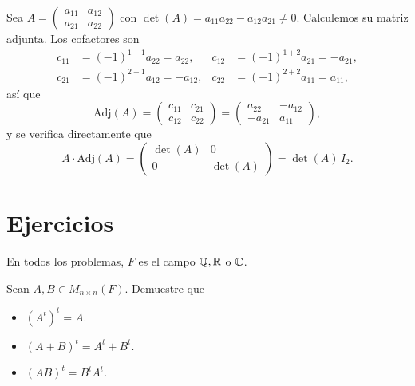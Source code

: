 \documentclass[12pt,a4paper]{book}
\newcommand{\parentesis}[1]{\left(#1\right)}
\begin{document}
    \begin{ejemplo}
        Sea $A = \begin{pmatrix} a_{11} & a_{12} \\ a_{21} & a_{22} \end{pmatrix}$ con $\det(A) = a_{11}a_{22} - a_{12}a_{21} \neq 0$. Calculemos su matriz adjunta. Los cofactores son
        \begin{align*}
            c_{11} & = (-1)^{1+1} a_{22} = a_{22}, & c_{12} & = (-1)^{1+2} a_{21} = -a_{21}, \\
            c_{21} & = (-1)^{2+1} a_{12} = -a_{12}, & c_{22} & = (-1)^{2+2} a_{11} = a_{11},
        \end{align*}
        así que
        \begin{equation*}
            \text{Adj}(A) = \begin{pmatrix} c_{11} & c_{21} \\ c_{12} & c_{22} \end{pmatrix} = \begin{pmatrix} a_{22} & -a_{12} \\ -a_{21} & a_{11} \end{pmatrix},
        \end{equation*}
        y se verifica directamente que
        \begin{equation*}
            A \cdot \text{Adj}(A) = \begin{pmatrix} \det(A) & 0 \\ 0 & \det(A) \end{pmatrix} = \det(A) \, I_2.
        \end{equation*}
    \end{ejemplo}

    
    
    
    

    \section{Ejercicios}

    En todos los problemas, $F$ es el campo $\mathbb{Q}, \mathbb{R}$ o $\mathbb{C}$.

    \begin{ejercicio}
        Sean $A, B \in M_{n \times n}(F)$. Demuestre que
        \begin{itemize}
            \item[(a)] $\parentesis{A^t}^t = A$.
            \item[(b)] $\parentesis{A + B}^t = A^t + B^t$.
            \item[(c)] $\parentesis{AB}^t = B^t A^t$.
        \end{itemize}
    \end{ejercicio}
\end{document}
